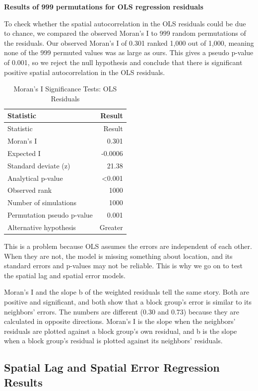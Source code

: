 \documentclass[
  12pt,
]{article}
\newcounter{none} %
\begin{document}
\textbf{Results of 999 permutations for OLS regression residuals}

To check whether the spatial autocorrelation in the OLS residuals could
be due to chance, we compared the observed Moran's I to 999 random
permutations of the residuals. Our observed Moran's I of 0.301 ranked
1,000 out of 1,000, meaning none of the 999 permuted values was as large
as ours. This gives a pseudo p-value of 0.001, so we reject the null
hypothesis and conclude that there is significant positive spatial
autocorrelation in the OLS residuals.

\begin{longtable}[]{@{}lr@{}}
\caption{Moran's I Significance Tests: OLS Residuals}\tabularnewline
\toprule\noalign{}
Statistic & Result \\
\midrule\noalign{}
\endfirsthead
\toprule\noalign{}
Statistic & Result \\
\midrule\noalign{}
\endhead
\bottomrule\noalign{}
\endlastfoot
Moran's I & 0.301 \\
Expected I & -0.0006 \\
Standard deviate (z) & 21.38 \\
Analytical p-value & \textless0.001 \\
Observed rank & 1000 \\
Number of simulations & 1000 \\
Permutation pseudo p-value & 0.001 \\
Alternative hypothesis & Greater \\
\end{longtable}

This is a problem because OLS assumes the errors are independent of each
other. When they are not, the model is missing something about location,
and its standard errors and p-values may not be reliable. This is why we
go on to test the spatial lag and spatial error models.

Moran's I and the slope b of the weighted residuals tell the same story.
Both are positive and significant, and both show that a block group's
error is similar to its neighbors' errors. The numbers are different
(0.30 and 0.73) because they are calculated in opposite directions.
Moran's I is the slope when the neighbors' residuals are plotted against
a block group's own residual, and b is the slope when a block group's
residual is plotted against its neighbors' residuals.

\subsection{Spatial Lag and Spatial Error Regression
Results}\label{spatial-lag-and-spatial-error-regression-results}
\end{document}
